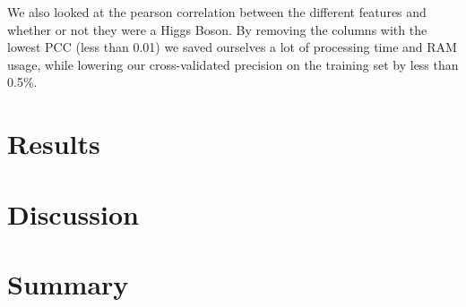 \documentclass[10pt,conference,compsocconf]{IEEEtran}
\begin{document}
We also looked at the pearson correlation between the different features and whether or not they were a Higgs Boson. By removing the %
columns with the lowest PCC (less than 0.01) we saved ourselves a lot of processing time and RAM usage, while lowering our cross-validated precision on the training set by less than 0.5\%.

\section{Results}

\section{Discussion}


\section{Summary}
\end{document}
